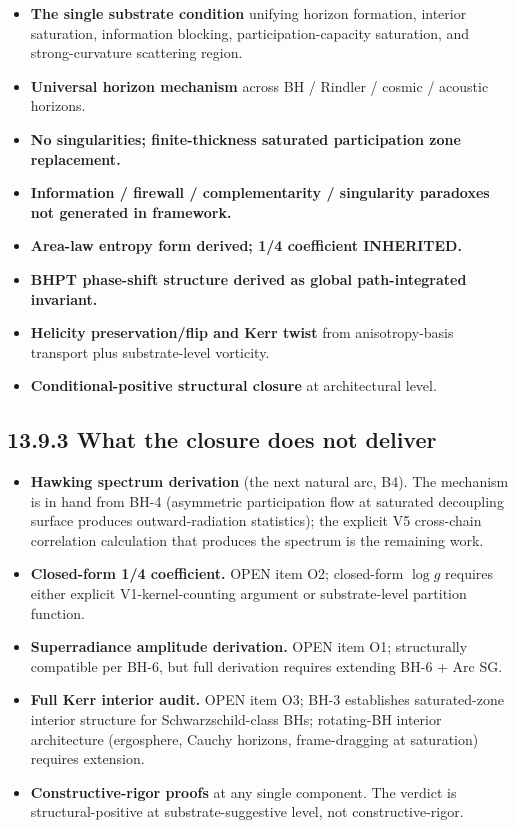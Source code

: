 \documentclass[11pt]{book}
\begin{document}
\begin{itemize}
\item \textbf{The single substrate condition} unifying horizon formation, interior saturation, information blocking, participation-capacity saturation, and strong-curvature scattering region.
\item \textbf{Universal horizon mechanism} across BH / Rindler / cosmic / acoustic horizons.
\item \textbf{No singularities; finite-thickness saturated participation zone replacement.}
\item \textbf{Information / firewall / complementarity / singularity paradoxes not generated in framework.}
\item \textbf{Area-law entropy form derived; 1/4 coefficient INHERITED.}
\item \textbf{BHPT phase-shift structure derived as global path-integrated invariant.}
\item \textbf{Helicity preservation/flip and Kerr twist} from anisotropy-basis transport plus substrate-level vorticity.
\item \textbf{Conditional-positive structural closure} at architectural level.
\end{itemize}

\subsection{13.9.3 What the closure does not deliver}

\begin{itemize}
\item \textbf{Hawking spectrum derivation} (the next natural arc, B4). The mechanism is in hand from BH-4 (asymmetric participation flow at saturated decoupling surface produces outward-radiation statistics); the explicit V5 cross-chain correlation calculation that produces the spectrum is the remaining work.
\item \textbf{Closed-form 1/4 coefficient.} OPEN item O2; closed-form $\log g$ requires either explicit V1-kernel-counting argument or substrate-level partition function.
\item \textbf{Superradiance amplitude derivation.} OPEN item O1; structurally compatible per BH-6, but full derivation requires extending BH-6 + Arc SG.
\item \textbf{Full Kerr interior audit.} OPEN item O3; BH-3 establishes saturated-zone interior structure for Schwarzschild-class BHs; rotating-BH interior architecture (ergosphere, Cauchy horizons, frame-dragging at saturation) requires extension.
\item \textbf{Constructive-rigor proofs} at any single component. The verdict is structural-positive at substrate-suggestive level, not constructive-rigor.
\end{itemize}
\end{document}
